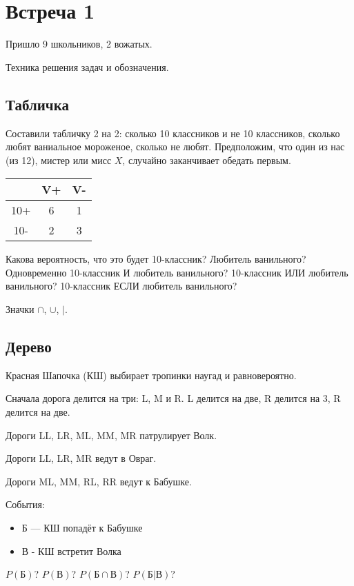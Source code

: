 \documentclass[a4paper, 12pt]{article}
\begin{document}
\section{Встреча 1}

Пришло 9 школьников, 2 вожатых.

Техника решения задач и обозначения.

\subsection{Табличка}

Составили табличку 2 на 2: сколько 10 классников и не 10 классников, сколько любят ваниальное мороженое, сколько не любят. Предположим, что один из нас (из 12), мистер или мисс $X$, случайно заканчивает обедать первым.

\begin{tabular}{ccc}
\toprule
 & V+ & V- \\
\midrule
10+ & 6 & 1 \\
10- & 2 & 3 \\
\bottomrule
\end{tabular}

Какова вероятность, что это будет 10-классник? Любитель ванильного? Одновременно 10-классник И любитель ванильного?
10-классник ИЛИ любитель ванильного? 10-классник ЕСЛИ любитель ванильного?

Значки $\cap$, $\cup$, $|$.

\subsection{Дерево}

Красная Шапочка (КШ) выбирает тропинки наугад и равновероятно.

Сначала дорога делится на три: L, M и R. L делится на две, R делится на 3, R делится на две.

Дороги LL, LR, ML, MM, MR патрулирует Волк.

Дороги LL, LR, MR ведут в Овраг.

Дороги ML, MM, RL, RR ведут к Бабушке.


События:

\begin{itemize}
  \item Б — КШ попадёт к Бабушке
  \item В - КШ встретит Волка
\end{itemize}

$P(\text{Б})$? $P(\text{В})$? $P(\text{Б}\cap \text{В})$? $P(\text{Б} | \text{В})$?
\end{document}
